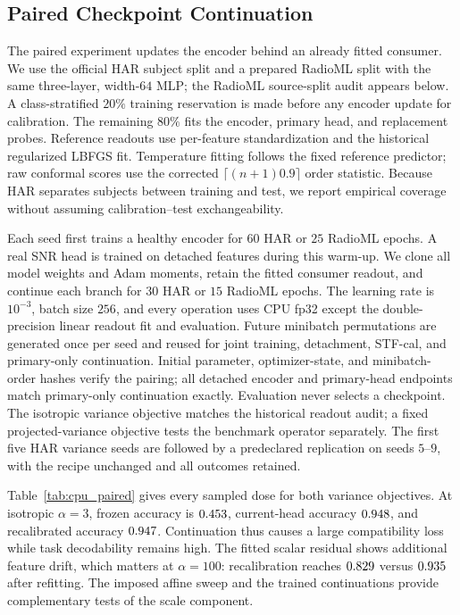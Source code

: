 \documentclass{article}
\begin{document}
\subsection{Paired Checkpoint Continuation}\label{app:cpu_paired}

The paired experiment updates the encoder behind an already fitted consumer. We use the official HAR subject split and a prepared RadioML split with the same three-layer, width-$64$ MLP; the RadioML source-split audit appears below. A class-stratified $20\%$ training reservation is made before any encoder update for calibration. The remaining $80\%$ fits the encoder, primary head, and replacement probes. Reference readouts use per-feature standardization and the historical regularized LBFGS fit. Temperature fitting follows the fixed reference predictor; raw conformal scores use the corrected $\lceil(n+1)0.9\rceil$ order statistic. Because HAR separates subjects between training and test, we report empirical coverage without assuming calibration--test exchangeability.

Each seed first trains a healthy encoder for $60$ HAR or $25$ RadioML epochs. A real SNR head is trained on detached features during this warm-up. We clone all model weights and Adam moments, retain the fitted consumer readout, and continue each branch for $30$ HAR or $15$ RadioML epochs. The learning rate is $10^{-3}$, batch size $256$, and every operation uses CPU fp32 except the double-precision linear readout fit and evaluation. Future minibatch permutations are generated once per seed and reused for joint training, detachment, STF-cal, and primary-only continuation. Initial parameter, optimizer-state, and minibatch-order hashes verify the pairing; all detached encoder and primary-head endpoints match primary-only continuation exactly. Evaluation never selects a checkpoint. The isotropic variance objective matches the historical readout audit; a fixed projected-variance objective tests the benchmark operator separately. The first five HAR variance seeds are followed by a predeclared replication on seeds $5$--$9$, with the recipe unchanged and all outcomes retained.

Table~\ref{tab:cpu_paired} gives every sampled dose for both variance objectives. At isotropic $\alpha=3$, frozen accuracy is $0.453$, current-head accuracy $0.948$, and recalibrated accuracy $0.947$. Continuation thus causes a large compatibility loss while task decodability remains high. The fitted scalar residual shows additional feature drift, which matters at $\alpha=100$: recalibration reaches $0.829$ versus $0.935$ after refitting. The imposed affine sweep and the trained continuations provide complementary tests of the scale component.
\end{document}
